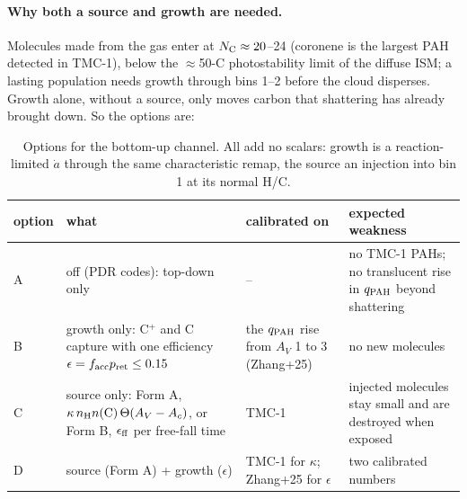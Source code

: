 \documentclass[11pt,a4paper]{article}
\newcommand{\NC}{N_{\rm C}}
\begin{document}
\paragraph{Why both a source and growth are needed.} Molecules made from the gas enter at $\NC\approx20$--24
(coronene is the largest PAH detected in TMC-1), below the $\approx$50-C photostability limit of the diffuse ISM; a
lasting population needs growth through bins 1--2 before the cloud disperses. Growth alone, without a source, only moves
carbon that shattering has already brought down. So the options are:

\begin{table}[H]
\centering\small
\caption{Options for the bottom-up channel. All add no scalars: growth is a reaction-limited $\dot a$ through the same
characteristic remap, the source an injection into bin 1 at its normal H/C.}\label{tab:growthopts}
\begin{tabularx}{\textwidth}{@{}l L L L@{}}
\toprule
option & what & calibrated on & expected weakness \\
\midrule
A & off (PDR codes): top-down only & -- & no TMC-1 PAHs; no translucent rise in $q_{\rm PAH}$ beyond shattering \\
B & growth only: C$^+$ and C capture with one efficiency $\epsilon = f_{\rm acc}p_{\rm ret}\le0.15$ & the $q_{\rm PAH}$ rise from $A_V$ 1 to 3 (Zhang+25) & no new molecules \\
C & source only: Form A, $\kappa\,n_{\rm H}n({\rm C})\,\Theta(A_V - A_c)$, or Form B, $\epsilon_{\rm ff}$ per free-fall time & TMC-1 & injected molecules stay small and are destroyed when exposed \\
D & source (Form A) + growth ($\epsilon$) & TMC-1 for $\kappa$; Zhang+25 for $\epsilon$ & two calibrated numbers \\
\bottomrule
\end{tabularx}
\end{table}
\end{document}
